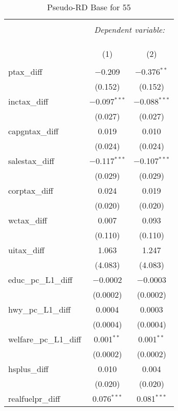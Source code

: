 
\begin{table}[!htbp] \centering 
  \caption{Pseudo-RD Base for  55} 
  \label{} 
\begin{tabular}{@{\extracolsep{5pt}}lcc} 
\\[-1.8ex]\hline 
\hline \\[-1.8ex] 
 & \multicolumn{2}{c}{\textit{Dependent variable:}} \\ 
\cline{2-3} 
\\[-1.8ex] & \multicolumn{2}{c}{ } \\ 
\\[-1.8ex] & (1) & (2)\\ 
\hline \\[-1.8ex] 
 ptax\_diff & $-$0.209 & $-$0.376$^{**}$ \\ 
  & (0.152) & (0.152) \\ 
  inctax\_diff & $-$0.097$^{***}$ & $-$0.088$^{***}$ \\ 
  & (0.027) & (0.027) \\ 
  capgntax\_diff & 0.019 & 0.010 \\ 
  & (0.024) & (0.024) \\ 
  salestax\_diff & $-$0.117$^{***}$ & $-$0.107$^{***}$ \\ 
  & (0.029) & (0.029) \\ 
  corptax\_diff & 0.024 & 0.019 \\ 
  & (0.020) & (0.020) \\ 
  wctax\_diff & 0.007 & 0.093 \\ 
  & (0.110) & (0.110) \\ 
  uitax\_diff & 1.063 & 1.247 \\ 
  & (4.083) & (4.083) \\ 
  educ\_pc\_L1\_diff & $-$0.0002 & $-$0.0003 \\ 
  & (0.0002) & (0.0002) \\ 
  hwy\_pc\_L1\_diff & 0.0004 & 0.0003 \\ 
  & (0.0004) & (0.0004) \\ 
  welfare\_pc\_L1\_diff & 0.001$^{**}$ & 0.001$^{**}$ \\ 
  & (0.0002) & (0.0002) \\ 
  hsplus\_diff & 0.010 & 0.004 \\ 
  & (0.020) & (0.020) \\ 
  realfuelpr\_diff & 0.076$^{***}$ & 0.081$^{***}$ \\ 

\end{tabular}
\end{table}

